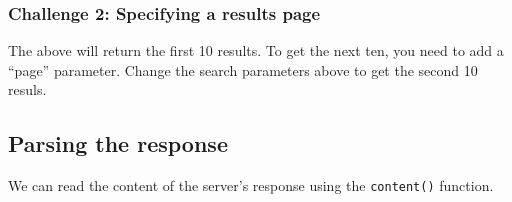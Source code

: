 \documentclass[]{book}
\begin{document}
\hypertarget{challenge-2-specifying-a-results-page}{%
\subsubsection*{Challenge 2: Specifying a results page}\label{challenge-2-specifying-a-results-page}}

The above will return the first 10 results. To get the next ten, you need to add a ``page'' parameter. Change the search parameters above to get the second 10 resuls.

\hypertarget{parsing-the-response}{%
\subsection{Parsing the response}\label{parsing-the-response}}

We can read the content of the server's response using the \texttt{content()} function.
\end{document}
